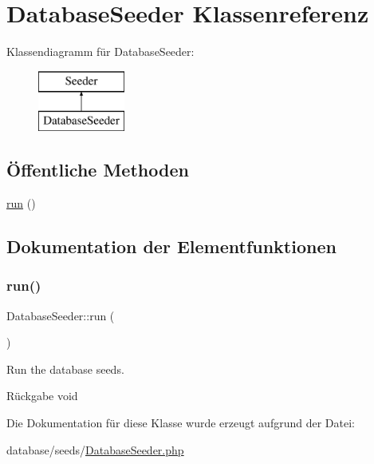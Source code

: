 \hypertarget{classDatabaseSeeder}{}\section{Database\+Seeder Klassenreferenz}
\label{classDatabaseSeeder}
Klassendiagramm für Database\+Seeder\+:\begin{figure}[H]
\begin{center}
\leavevmode
\includegraphics[height=2.000000cm]{d2/df4/classDatabaseSeeder}
\end{center}
\end{figure}
\subsection*{Öffentliche Methoden}
\begin{DoxyCompactItemize}
\item 
\hyperlink{classDatabaseSeeder_af7f8ef393ab636b367cac7891d87d4b7}{run} ()
\end{DoxyCompactItemize}


\subsection{Dokumentation der Elementfunktionen}
\mbox{\label{classDatabaseSeeder_af7f8ef393ab636b367cac7891d87d4b7}} 
\subsubsection{\texorpdfstring{run()}{run()}}
{\footnotesize\ttfamily Database\+Seeder\+::run (\begin{DoxyParamCaption}{ }\end{DoxyParamCaption})}

Run the database seeds.

\begin{DoxyReturn}{Rückgabe}
void 
\end{DoxyReturn}


Die Dokumentation für diese Klasse wurde erzeugt aufgrund der Datei\+:\begin{DoxyCompactItemize}
\item 
database/seeds/\hyperlink{DatabaseSeeder_8php}{Database\+Seeder.\+php}\end{DoxyCompactItemize}
